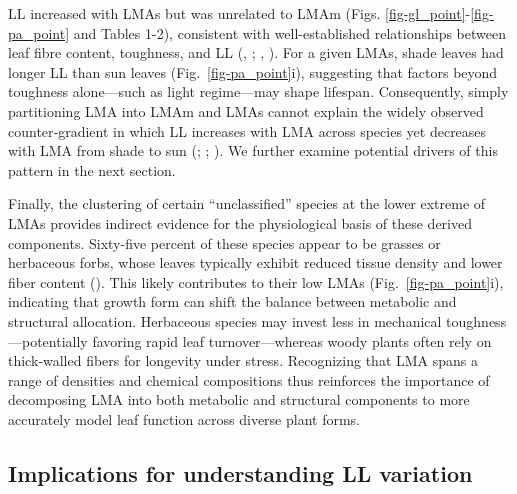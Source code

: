 \documentclass[
  12pt,
  letterpaper,
  DIV=11,
  numbers=noendperiod]{scrartcl}
\begin{document}
LL increased with LMAs but was unrelated to LMAm (Figs.
\ref{fig-gl_point}-\ref{fig-pa_point} and Tables 1-2), consistent with
well-established relationships between leaf fibre content, toughness,
and LL (,
; , ). For a given LMAs, shade
leaves had longer LL than sun leaves (Fig.~\ref{fig-pa_point}i),
suggesting that factors beyond toughness alone---such as light
regime---may shape lifespan. Consequently, simply partitioning LMA into
LMAm and LMAs cannot explain the widely observed counter‐gradient in
which LL increases with LMA across species yet decreases with LMA from
shade to sun (;
;
). We further examine
potential drivers of this pattern in the next section.

Finally, the clustering of certain ``unclassified'' species at the lower
extreme of LMAs provides indirect evidence for the physiological basis
of these derived components. Sixty-five percent of these species appear
to be grasses or herbaceous forbs, whose leaves typically exhibit
reduced tissue density and lower fiber content
(). This likely contributes
to their low LMAs (Fig.~\ref{fig-pa_point}i), indicating that growth
form can shift the balance between metabolic and structural allocation.
Herbaceous species may invest less in mechanical toughness---potentially
favoring rapid leaf turnover---whereas woody plants often rely on
thick‐walled fibers for longevity under stress. Recognizing that LMA
spans a range of densities and chemical compositions thus reinforces the
importance of decomposing LMA into both metabolic and structural
components to more accurately model leaf function across diverse plant
forms.

\subsection{Implications for understanding LL
variation}\label{implications-for-understanding-ll-variation}
\end{document}
